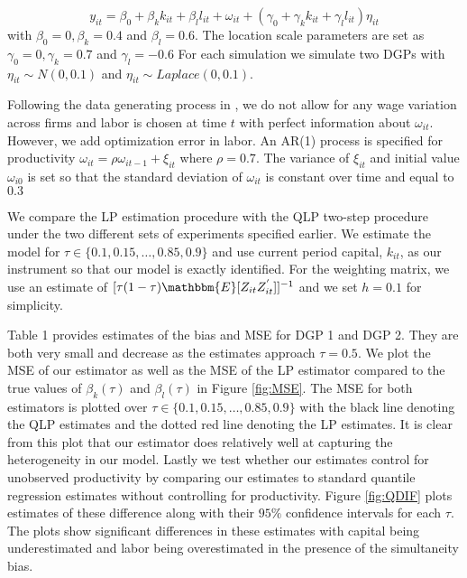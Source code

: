 \documentclass[11pt]{article}
\begin{document}
\begin{equation}
y_{it}=\beta_{0}+\beta_{k}k_{it}+\beta_{l}l_{it}+\omega_{it}+(\gamma_{0}+\gamma_{k}k_{it}+\gamma_{l}l_{it})\eta_{it}
\end{equation}
with $\beta_{0}=0, \beta_{k}=0.4$ and $\beta_{l}=0.6$. The location scale parameters are set as $\gamma_{0}=0, \gamma_{k}=0.7$ and $\gamma_{l}=-0.6$ For each simulation we simulate two DGPs with $\eta_{it}\sim N(0,0.1)$ and $\eta_{it}\sim Laplace(0,0.1)$.

Following the data generating process in \cite{Ackerberg2015}, we do not allow for any wage variation across firms and labor is chosen at time $t$ with perfect information about $\omega_{it}$. However, we add optimization error in labor. An AR(1) process is specified for productivity $\omega_{it}=\rho\omega_{it-1}+\xi_{it}$ where $\rho=0.7$. The variance of $\xi_{it}$ and initial value $\omega_{i0}$ is set so that the standard deviation of $\omega_{it}$ is constant over time and equal to $0.3$

We compare the LP estimation procedure with the QLP two-step procedure under the two different sets of experiments specified earlier. We estimate the model for $\tau\in\{0.1, 0.15, \dots, 0.85, 0.9\}$ and use current period capital, $k_{it}$, as our instrument so that our model is exactly identified. For the weighting matrix, we use an estimate of $[\tau(1-\tau)\mathbbm{E}[Z_{it}Z^{'}_{it}]]^{-1}$ and we set $h=0.1$ for simplicity.

Table 1 provides estimates of the bias and MSE for DGP 1 and DGP 2. They are both very small and decrease as the estimates approach $\tau=0.5$. We plot the MSE of our estimator as well as the MSE of the LP estimator compared to the true values of $\beta_{k}(\tau)$ and $\beta_{l}(\tau)$ in Figure \ref{fig:MSE}. The MSE for both estimators is plotted over $\tau\in\{0.1, 0.15, \dots, 0.85, 0.9\}$ with the black line denoting the QLP estimates and the dotted red line denoting the LP estimates. It is clear from this plot that our estimator does relatively well at capturing the heterogeneity in our model. Lastly we test whether our estimates control for unobserved productivity by comparing our estimates to standard quantile regression estimates without controlling for productivity. Figure \ref{fig:QDIF} plots estimates of these difference along with their $95\%$ confidence intervals for each $\tau$. The plots show significant differences in these estimates with capital being underestimated and labor being overestimated in the presence of the simultaneity bias.
\end{document}
